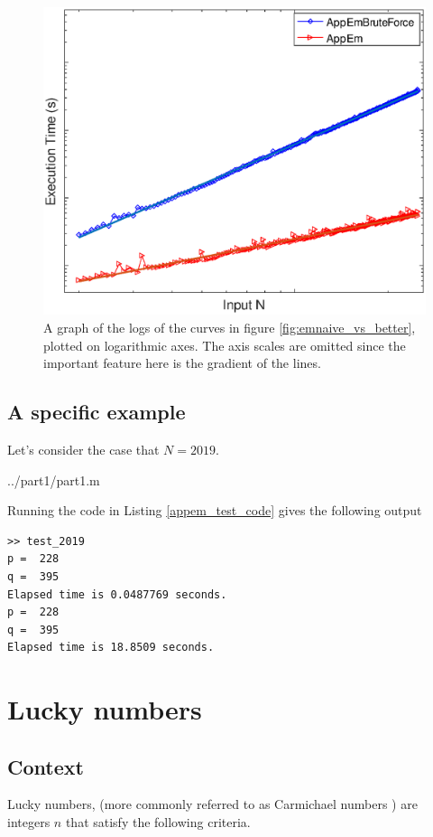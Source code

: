\documentclass[10pt]{article}
\begin{document}
\begin{figure}[!htb]
\centering
   \includegraphics[scale=0.5]{bruteforce_vs_better_logs.eps}

   \caption{A graph of the logs of the curves in figure \ref{fig:emnaive_vs_better}, plotted on logarithmic axes. The axis scales are omitted since the important feature here is the gradient of the lines.}
      \label{loglog}
\end{figure}

\subsection{A specific example}

Let's consider the case that $N = 2019$. 

   {../part1/part1.m}
  
Running the code in Listing \ref{appem_test_code} gives the following output

\begin{verbatim}
>> test_2019
p =  228
q =  395
Elapsed time is 0.0487769 seconds.
p =  228
q =  395
Elapsed time is 18.8509 seconds.
\end{verbatim}

\section{Lucky numbers}

\subsection{Context}
Lucky numbers, (more commonly referred to as Carmichael numbers \cite{carmichael}) are integers $n$ that satisfy the following criteria.
\end{document}
